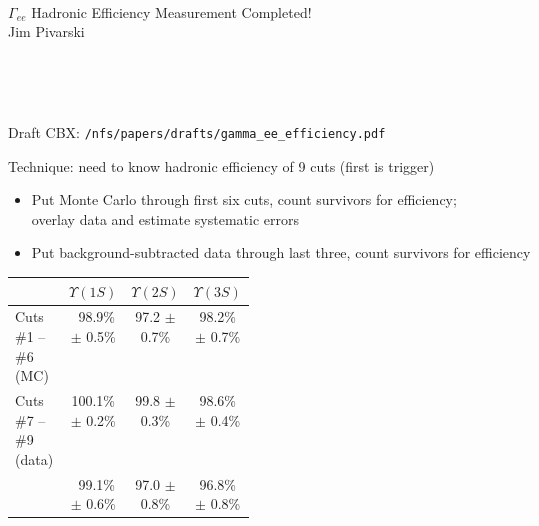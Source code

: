 \documentclass[landscape]{article}
\begin{document}
\huge
\renewcommand{\labelitemi}{-}
\setlength{\parindent}{0 cm}

\mbox{ }

\vfill

\begin{center}
  \Huge $\Gamma_{ee}$ Hadronic Efficiency Measurement Completed! \\

  \vspace{1.5 cm}
  Jim Pivarski
\end{center}

\vfill

\mbox{ }

\pagebreak

\mbox{ }

\vfill

Draft CBX: {\tt /nfs/papers/drafts/gamma\_ee\_efficiency.pdf}

\vfill

Technique: need to know hadronic efficiency of 9 cuts (first is trigger)
\begin{itemize}\setlength{\itemsep}{0.5 cm}

  \item Put Monte Carlo through first six cuts, count survivors for
  efficiency; \\ overlay data and estimate systematic errors

  \item Put background-subtracted data through last three, count
  survivors for efficiency

\end{itemize}

\vfill

\begin{center}\renewcommand{\arraystretch}{1.5}
  \begin{tabular}{p{0.28\linewidth} c c c}
    & $\Upsilon(1S)$ & $\Upsilon(2S)$ & $\Upsilon(3S)$ \\\hline
    Cuts \#1 -- \#6 (MC)   & \mbox{ }98.9\% $\pm$ 0.5\% &  97.2 $\pm$ 0.7\% &  98.2\% $\pm$ 0.7\% \\
    Cuts \#7 -- \#9 (data) &        100.1\% $\pm$ 0.2\% &  99.8 $\pm$ 0.3\% &  98.6\% $\pm$ 0.4\% \\\hline\hline
    & \mbox{ }99.1\% $\pm$ 0.6\% &  97.0 $\pm$ 0.8\% &  96.8\% $\pm$ 0.8\% \\
  \end{tabular}
\renewcommand{\arraystretch}{1}\end{center}
\end{document}
